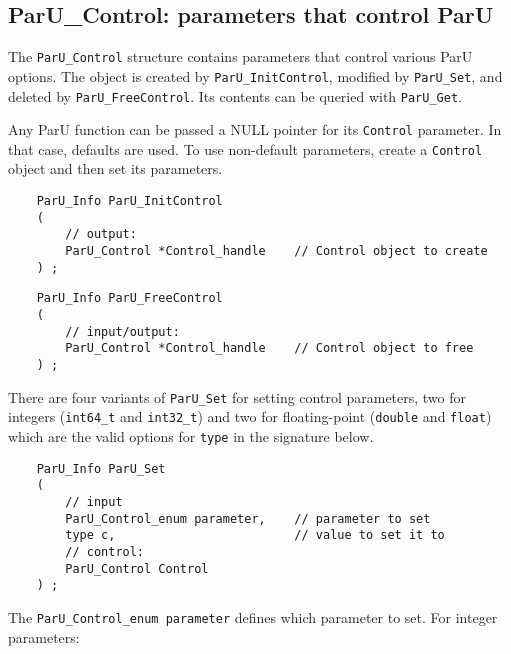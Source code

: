 \documentclass[12pt]{article}
\begin{document}
\subsection{{\sf ParU\_Control}: parameters that control ParU}
\label{control}

    The \verb'ParU_Control' structure contains parameters that control various
    ParU options.  The object is created by \verb'ParU_InitControl',
    modified by \verb'ParU_Set', and deleted by \verb'ParU_FreeControl'.
    Its contents can be queried with \verb'ParU_Get'.

    Any ParU function can be passed a NULL pointer for its \verb'Control'
    parameter.  In that case, defaults are used.  To use non-default
    parameters, create a \verb'Control' object and then set its parameters.

    {\footnotesize
    \begin{verbatim}
    ParU_Info ParU_InitControl
    (
        // output:
        ParU_Control *Control_handle    // Control object to create
    ) ; \end{verbatim}}

    {\footnotesize
    \begin{verbatim}
    ParU_Info ParU_FreeControl
    (
        // input/output:
        ParU_Control *Control_handle    // Control object to free
    ) ; \end{verbatim}}

    There are four variants of \verb'ParU_Set' for setting control parameters,
    two for integers (\verb'int64_t' and \verb'int32_t') and two for
    floating-point (\verb'double' and \verb'float') which are the valid options
    for \verb'type' in the signature below.

    {\footnotesize
    \begin{verbatim}
    ParU_Info ParU_Set
    (
        // input
        ParU_Control_enum parameter,    // parameter to set
        type c,                         // value to set it to
        // control:
        ParU_Control Control
    ) ; \end{verbatim}}

    The \verb'ParU_Control_enum parameter' defines which parameter to set.
    For integer parameters:
\end{document}

